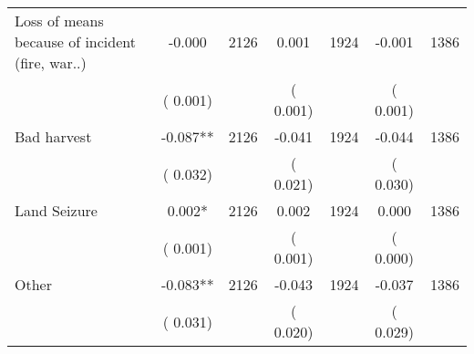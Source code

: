 \begin{tabular}{l*{6}{c}}
Loss of means because of incident (fire, war..)        &             -0.000      &       2126       &              0.001      &       1924       &             -0.001      &       1386       \\
                       &       (       0.001)            &                               &       (       0.001)            &                               &       (       0.001)            &                               \\
Bad harvest        &             -0.087**      &       2126       &             -0.041      &       1924       &             -0.044      &       1386       \\
                       &       (       0.032)            &                               &       (       0.021)            &                               &       (       0.030)            &                               \\
Land Seizure        &              0.002*      &       2126       &              0.002      &       1924       &              0.000      &       1386       \\
                       &       (       0.001)            &                               &       (       0.001)            &                               &       (       0.000)            &                               \\
Other        &             -0.083**      &       2126       &             -0.043      &       1924       &             -0.037      &       1386       \\
                       &       (       0.031)            &                               &       (       0.020)            &                               &       (       0.029)            &                               \\
\hline \end{tabular}